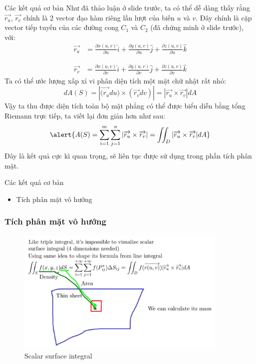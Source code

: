 \documentclass[8pt]{beamer}
\begin{document}
\begin{frame}{Các kết quả cơ bản}
	Như đã thảo luận ở slide trước, ta có thể dễ dàng thấy rằng $\overrightarrow{r_{u}}$, $\overrightarrow{r_{v}}$ chính là 2 vector đạo hàm riêng lần lượt của biến $u$ và $v$. Đây chính là cặp vector tiếp tuyến của các đường cong $C_{1}$ và $C_{2}$ (đã chứng minh ở slide trước), với:
\begin{equation*}
\begin{split}
	\overrightarrow{r_{u}}&=\frac{\partial x(u,v)}{\partial u}\hat i+\frac{\partial y(u,v)}{\partial u}\hat j+\frac{\partial z(u,v)}{\partial u}\hat k
\end{split}
\end{equation*}

\begin{equation*}
\begin{split}
	\overrightarrow{r_{v}}&=\frac{\partial x(u,v)}{\partial v}\hat i+\frac{\partial y(u,v)}{\partial v}\hat j+\frac{\partial z(u,v)}{\partial v}\hat k
\end{split}
\end{equation*}
Ta có thể ước lượng xấp xỉ vi phân diện tích một mặt chữ nhật rất nhỏ:
$$dA(S)=|\overrightarrow{(r_{u}}du)\times(\overrightarrow{r_{v}}dv)|=|\overrightarrow{r_{u}}\times\overrightarrow{r_{v}}|dA$$
Vậy ta thu được diện tích toàn bộ mặt phẳng có thể được biểu diễn bằng tổng Riemann trực tiếp, ta viết lại đơn giản hơn như sau:
$$\alert{A(S)=\sum_{i=1}^{m}\sum_{j=1}^{n}|\overrightarrow{r_{u}}\times\overrightarrow{r_{v}}|=\iint_{D}|\overrightarrow{r_{u}}\times\overrightarrow{r_{v}}|dA}$$
Đây là kết quả cực kì quan trọng, sẽ liên tục được sử dụng trong phần tích phân mặt.
\end{frame}
\begin{frame}{Các kết quả cơ bản}
\begin{itemize}
	\item Tích phân mặt vô hướng
\end{itemize}
\subsubsection{Tích phân mặt vô hướng}
\begin{figure}[h]
			\includegraphics[width=0.9\textwidth]{sheet.jpg}
			\caption{Scalar surface integral}			\label{fig:re5}
\end{figure}

\end{frame}
\end{document}
